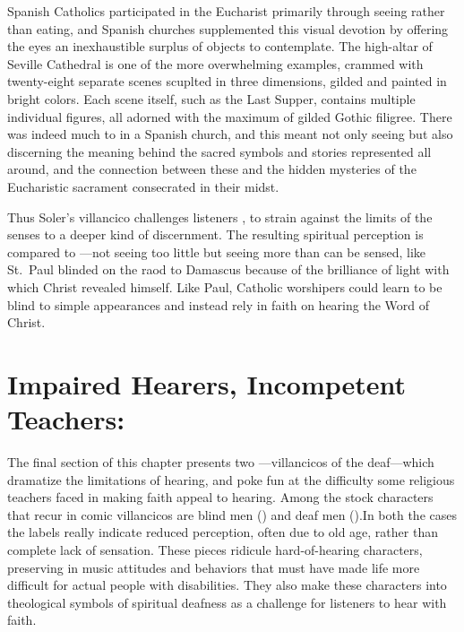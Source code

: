 
Spanish Catholics participated in the Eucharist primarily through seeing rather than eating,\citXXX{} and Spanish churches supplemented this visual devotion by offering the eyes an inexhaustible surplus of objects to contemplate.
The high-altar  of Seville Cathedral is one of the more overwhelming examples, crammed with twenty-eight separate scenes scuplted in three dimensions, gilded and painted in bright colors.\citXXX{}
Each scene itself, such as the Last Supper, contains multiple individual figures, all adorned with the maximum of gilded Gothic filigree.
There was indeed much to  in a Spanish church, and this meant not only seeing but also discerning the meaning behind the sacred symbols and stories represented all around, and the connection between these and the hidden mysteries of the Eucharistic sacrament consecrated in their midst.

Thus Soler's villancico challenges listeners , to strain against the limits of the senses to a deeper kind of discernment.
The resulting spiritual perception is compared to ---not seeing too little but seeing more than can be sensed, like St.\ Paul blinded on the raod to Damascus because of the brilliance of light with which Christ revealed himself.
Like Paul, Catholic worshipers could learn to be blind to simple appearances and instead rely in faith on hearing the Word of Christ.

\section[Impaired Hearers, Incompetent Teachers]{Impaired Hearers, Incompetent Teachers: }

The final section of this chapter presents two ---villancicos of the deaf---which dramatize the limitations of hearing, and poke fun at the difficulty some religious teachers faced in making faith appeal to hearing.
Among the stock characters that recur in comic villancicos are blind men () and deaf men ().
In both the cases the labels really indicate reduced perception, often due to old age, rather than complete lack of sensation.
These pieces ridicule hard-of-hearing characters, preserving in music attitudes and behaviors that must have made life more difficult for actual people with disabilities.
They also make these characters into theological symbols of spiritual deafness as a challenge for  listeners to hear with faith.

